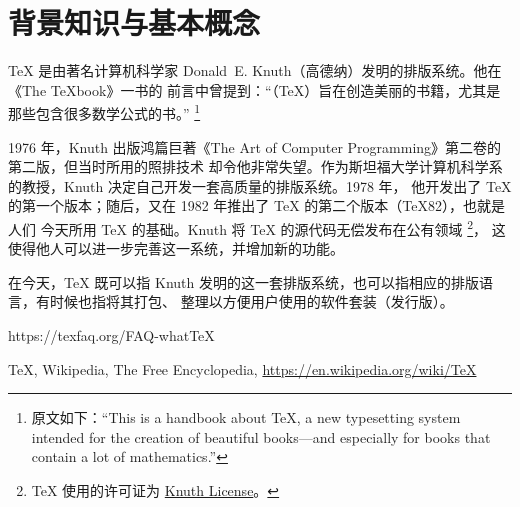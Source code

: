 %
%
%
%

\section{背景知识与基本概念}
\label{sec:basic}


\TeX{} 是由著名计算机科学家 Donald~E. Knuth（高德纳）发明的排版系统。他在《The \TeX book》一书的
前言中曾提到：“（\TeX{}）旨在创造美丽的书籍，尤其是那些包含很多数学公式的书。”
\footnote{原文如下：“This is a handbook about \TeX{}, a new typesetting system intended for the
creation of beautiful books---and especially for books that contain a lot of mathematics.”}

1976 年，Knuth 出版鸿篇巨著《The Art of Computer Programming》第二卷的第二版，但当时所用的照排技术
却令他非常失望。作为斯坦福大学计算机科学系的教授，Knuth 决定自己开发一套高质量的排版系统。1978 年，
他开发出了 \TeX{} 的第一个版本；随后，又在 1982 年推出了 \TeX{} 的第二个版本（\TeX 82），也就是人们
今天所用 \TeX{} 的基础。Knuth 将 \TeX{} 的源代码无偿发布在公有领域
\footnote{\TeX{} 使用的许可证为 \href{https://www.ctan.org/license/knuth}{Knuth License}。}，
这使得他人可以进一步完善这一系统，并增加新的功能。

在今天，\TeX{} 既可以指 Knuth 发明的这一套排版系统，也可以指相应的排版语言，有时候也指将其打包、
整理以方便用户使用的软件套装（发行版）。

\begin{reference}
  \item https://texfaq.org/FAQ-whatTeX
  \item \TeX{}, Wikipedia, The Free Encyclopedia, \url{https://en.wikipedia.org/wiki/TeX}
\end{reference}



